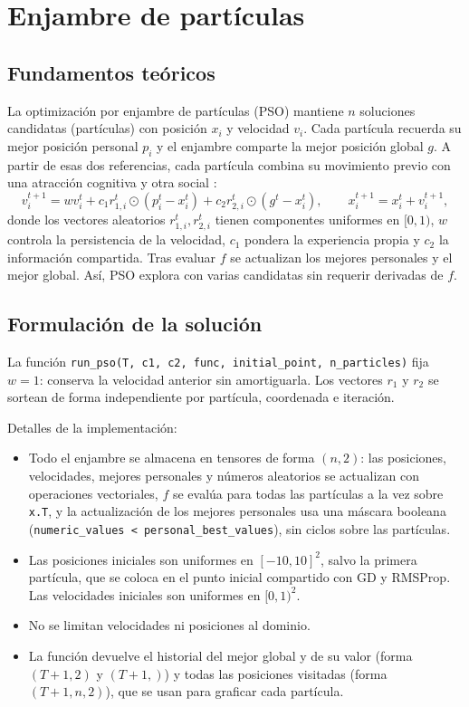 \section{Enjambre de partículas}
\label{sec:pso}

\subsection{Fundamentos teóricos}

La optimización por enjambre de partículas (PSO) \cite{kennedy1995particle}
mantiene $n$ soluciones candidatas (partículas) con posición $x_i$ y
velocidad $v_i$. Cada partícula recuerda su mejor posición personal $p_i$ y
el enjambre comparte la mejor posición global $g$. A partir de esas dos
referencias, cada partícula combina su movimiento previo con una atracción
cognitiva y otra social \cite{shi1998modified}:
\[
v_i^{t+1} = wv_i^t + c_1 r_{1,i}^t \odot (p_i^t - x_i^t)
             + c_2 r_{2,i}^t \odot (g^t - x_i^t), \qquad
x_i^{t+1} = x_i^t + v_i^{t+1},
\]
donde los vectores aleatorios $r_{1,i}^t,r_{2,i}^t$ tienen componentes
uniformes en $[0,1)$, $w$ controla la persistencia de la velocidad, $c_1$
pondera la experiencia propia y $c_2$ la información compartida. Tras
evaluar $f$ se actualizan los mejores personales y el mejor global. Así,
PSO explora con varias candidatas sin requerir derivadas de $f$.

\subsection{Formulación de la solución}

La función \texttt{run\_pso(T, c1, c2, func, initial\_point,
n\_particles)} fija $w=1$: conserva la velocidad anterior sin
amortiguarla. Los vectores $r_1$ y $r_2$ se sortean de forma independiente
por partícula, coordenada e iteración.

Detalles de la implementación:
\begin{itemize}
    \item Todo el enjambre se almacena en tensores de forma $(n,2)$: las
    posiciones, velocidades, mejores personales y números aleatorios se
    actualizan con operaciones vectoriales, $f$ se evalúa para todas las
    partículas a la vez sobre \texttt{x.T}, y la actualización de los
    mejores personales usa una máscara booleana (\texttt{numeric\_values <
    personal\_best\_values}), sin ciclos sobre las partículas.
    \item Las posiciones iniciales son uniformes en $[-10,10]^2$, salvo la
    primera partícula, que se coloca en el punto inicial compartido con GD y
    RMSProp. Las velocidades iniciales son uniformes en $[0,1)^2$.
    \item No se limitan velocidades ni posiciones al dominio.
    \item La función devuelve el historial del mejor global y de su valor
    (forma $(T+1,2)$ y $(T+1,)$) y todas las posiciones visitadas (forma
    $(T+1,n,2)$), que se usan para graficar cada partícula.
\end{itemize}

